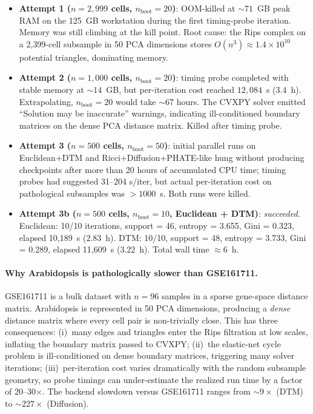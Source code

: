 \documentclass[11pt]{article}
\begin{document}
\begin{itemize}
\item \textbf{Attempt 1 ($n = 2{,}999$ cells, $n_{\text{boot}} = 20$)}: OOM-killed at $\sim 71$~GB peak RAM on the 125~GB workstation during the first timing-probe iteration. Memory was still climbing at the kill point. Root cause: the Rips complex on a 2{,}399-cell subsample in 50 PCA dimensions stores $O(n^3) \approx 1.4 \times 10^{10}$ potential triangles, dominating memory.

\item \textbf{Attempt 2 ($n = 1{,}000$ cells, $n_{\text{boot}} = 20$)}: timing probe completed with stable memory at $\sim 14$~GB, but per-iteration cost reached $12{,}084$~s ($3.4$~h). Extrapolating, $n_{\text{boot}} = 20$ would take $\sim 67$ hours. The CVXPY solver emitted ``Solution may be inaccurate'' warnings, indicating ill-conditioned boundary matrices on the dense PCA distance matrix. Killed after timing probe.

\item \textbf{Attempt 3 ($n = 500$ cells, $n_{\text{boot}} = 50$)}: initial parallel runs on Euclidean+DTM and Ricci+Diffusion+PHATE-like hung without producing checkpoints after more than 20 hours of accumulated CPU time; timing probes had suggested 31--204 s/iter, but actual per-iteration cost on pathological subsamples was $> 1000$~s. Both runs were killed.

\item \textbf{Attempt 3b ($n = 500$ cells, $n_{\text{boot}} = 10$, Euclidean + DTM)}: \emph{succeeded}. Euclidean: 10/10 iterations, support = 46, entropy = 3.655, Gini = 0.323, elapsed 10{,}189~s ($2.83$~h). DTM: 10/10, support = 48, entropy = 3.733, Gini = 0.289, elapsed 11{,}609~s ($3.22$~h). Total wall time $\approx 6$~h.
\end{itemize}

\paragraph{Why Arabidopsis is pathologically slower than GSE161711.}
GSE161711 is a bulk dataset with $n = 96$ samples in a sparse gene-space distance matrix.
Arabidopsis is represented in 50 PCA dimensions, producing a \emph{dense} distance matrix where every cell pair is non-trivially close.
This has three consequences:
(i)~many edges and triangles enter the Rips filtration at low scales, inflating the boundary matrix passed to CVXPY;
(ii)~the elastic-net cycle problem is ill-conditioned on dense boundary matrices, triggering many solver iterations;
(iii)~per-iteration cost varies dramatically with the random subsample geometry, so probe timings can under-estimate the realized run time by a factor of 20--30$\times$.
The backend slowdown versus GSE161711 ranges from $\sim 9\times$ (DTM) to $\sim 227\times$ (Diffusion).
\end{document}
